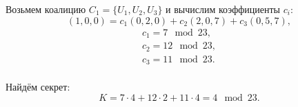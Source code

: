 Возьмем коалицию $C_1 = \{ U_1, U_2, U_3 \}$ и вычислим коэффициенты $c_i$:
    \[ (1,0,0) = c_1 (0,2,0) + c_2 (2,0,7) + c_3 (0,5,7), \]
\[ \begin{array}{l}
    c_1 = 7 \mod 23, \\
    c_2 = 12 \mod 23, \\
    c_3 = 11 \mod 23. \\
\end{array} \]

Найдём секрет:
    \[ K = 7 \cdot 4 + 12 \cdot 2 + 11 \cdot 4 = 4 \mod 23.\]
\exampleend
